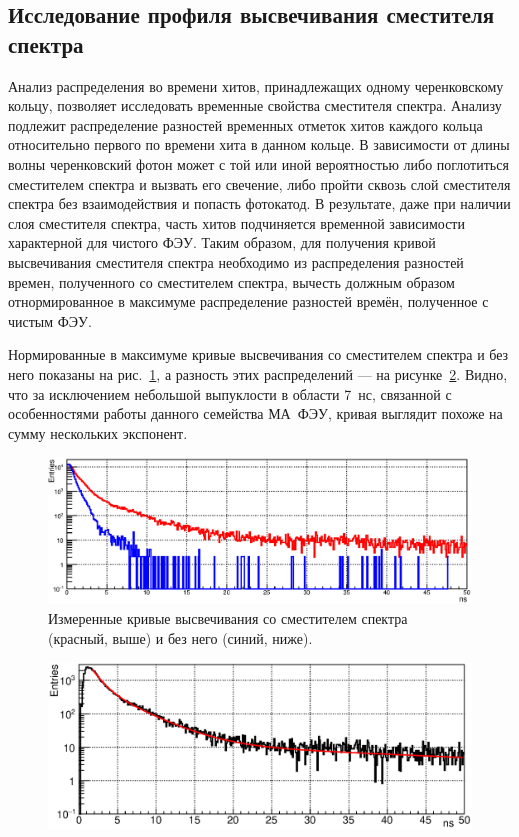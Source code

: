 \subsection{Исследование профиля высвечивания сместителя спектра}\label{section:secWLS}

Анализ распределения во времени хитов, принадлежащих одному черенковскому кольцу, позволяет исследовать временные свойства сместителя спектра. Анализу подлежит распределение разностей временных отметок хитов каждого кольца относительно первого по времени хита в данном кольце. В зависимости от длины волны черенковский фотон может с той или иной вероятностью либо поглотиться сместителем спектра и вызвать его свечение, либо пройти сквозь слой сместителя спектра без взаимодействия и попасть фотокатод. В результате, даже при наличии слоя сместителя спектра, часть хитов подчиняется временной зависимости характерной для чистого ФЭУ. Таким образом, для получения кривой высвечивания сместителя спектра необходимо из распределения разностей времен, полученного со сместителем спектра, вычесть должным образом отнормированное в максимуме распределение разностей времён, полученное с чистым ФЭУ.

Нормированные в максимуме кривые высвечивания со сместителем спектра и без него показаны на рис.~\ref{fig:WLStwoCurves}, а разность этих распределений --- на рисунке~\ref{fig:WLSdiff}. Видно, что за исключением небольшой выпуклости в области 7~нс, связанной с особенностями работы данного семейства МА~ФЭУ, кривая выглядит похоже на сумму нескольких экспонент.

\begin{figure}
\includegraphics[width=1.0\textwidth]{pictures/WLS.eps}
\caption{Измеренные кривые высвечивания со сместителем спектра (красный, выше) и без него (синий, ниже).}
\label{fig:WLStwoCurves}
\end{figure}

\begin{figure}
\includegraphics[width=1.0\textwidth]{pictures/WLSdiff_1Nov.eps}
\caption{}
\label{fig:WLSdiff}
\end{figure}

